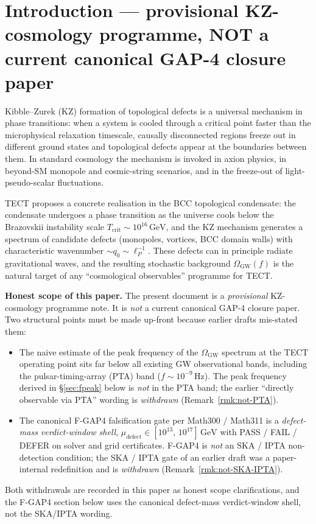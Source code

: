 \section{Introduction --- provisional KZ-cosmology programme,
NOT a current canonical GAP-4 closure paper}\label{sec:intro}

Kibble--Zurek (KZ) formation of topological defects is a universal
mechanism in phase transitions: when a system is cooled through a
critical point faster than the microphysical relaxation timescale,
causally disconnected regions freeze out in different ground states
and topological defects appear at the boundaries between them. In
standard cosmology the mechanism is invoked in axion physics, in
beyond-SM monopole and cosmic-string scenarios, and in the
freeze-out of light-pseudo-scalar fluctuations.

TECT proposes a concrete realisation in the BCC topological
condensate: the condensate undergoes a phase transition as the
universe cools below the Brazovskii instability scale
$T_{\mathrm{crit}}\sim 10^{16}\,\mathrm{GeV}$, and the KZ mechanism
generates a spectrum of candidate defects (monopoles, vortices,
BCC domain walls) with characteristic wavenumber
$\sim q_0\sim \ell_P^{-1}$. These defects can in principle radiate
gravitational waves, and the resulting stochastic background
$\Omega_{\mathrm{GW}}(f)$ is the natural target of any
``cosmological observables'' programme for TECT.

\textbf{Honest scope of this paper.} The present document is a
\emph{provisional} KZ-cosmology programme note. It is \emph{not} a
current canonical GAP-4 closure paper. Two structural points must be
made up-front because earlier drafts mis-stated them:
\begin{itemize}
  \item The naive estimate of the peak frequency of the
    $\Omega_{\mathrm{GW}}$ spectrum at the TECT operating point sits
    far below all existing GW observational bands, including the
    pulsar-timing-array (PTA) band ($f \sim 10^{-9}\,\mathrm{Hz}$).
    The peak frequency derived in \S\ref{sec:fpeak} below is
    \emph{not} in the PTA band; the earlier ``directly observable
    via PTA'' wording is \emph{withdrawn} (Remark~\ref{rmk:not-PTA}).
  \item The canonical F-GAP4 falsification gate per Math300 /
    Math311 is a \emph{defect-mass verdict-window shell},
    $\mu_{\mathrm{defect}} \in [10^{13},\,10^{17}]\,\mathrm{GeV}$
    with PASS / FAIL / DEFER on solver and grid certificates.
    F-GAP4 is \emph{not} an SKA / IPTA non-detection condition; the
    SKA / IPTA gate of an earlier draft was a paper-internal
    redefinition and is \emph{withdrawn}
    (Remark~\ref{rmk:not-SKA-IPTA}).
\end{itemize}
Both withdrawals are recorded in this paper as honest scope
clarifications, and the F-GAP4 section below uses the canonical
defect-mass verdict-window shell, not the SKA/IPTA wording.

